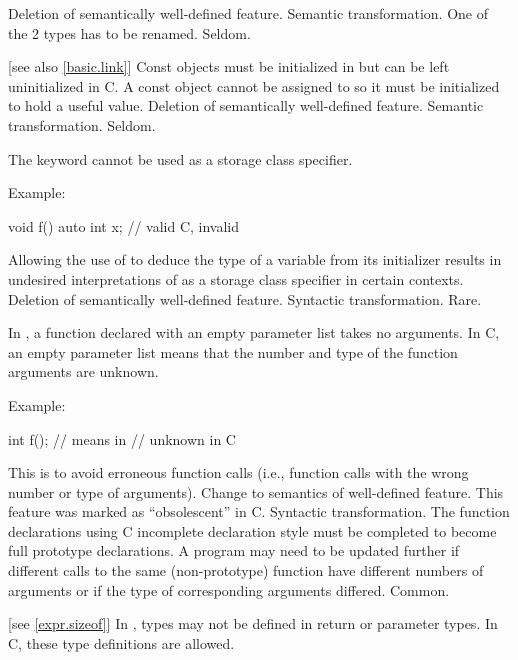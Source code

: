 \effect
Deletion of semantically well-defined feature.
\difficulty
Semantic transformation.
One of the 2 types has to be renamed.
\howwide
Seldom.

 [see also \ref{basic.link}]
\change
Const objects must be initialized in \Cpp{} but can be left uninitialized in C.
\rationale
A const object cannot be assigned to so it must be initialized
to hold a useful value.
\effect
Deletion of semantically well-defined feature.
\difficulty
Semantic transformation.
\howwide
Seldom.

\change
The keyword  cannot be used as a storage class specifier.

Example:
\begin{codeblock}
void f() {
  auto int x;       // valid C, invalid \Cpp{}
}
\end{codeblock}

\rationale
Allowing the use of  to deduce the type
of a variable from its initializer results in undesired interpretations of
 as a storage class specifier in certain contexts.
\effect
Deletion of semantically well-defined feature.
\difficulty
Syntactic transformation.
\howwide
Rare.

\change
In \Cpp{}, a function declared with an empty parameter list takes no arguments.
In C, an empty parameter list means that the number and type of the function arguments are unknown.

Example:
\begin{codeblock}
int f();            // means    in \Cpp{}
                    //  unknown \tcode{)} in C
\end{codeblock}

\rationale
This is to avoid erroneous function calls (i.e., function calls
with the wrong number or type of arguments).
\effect
Change to semantics of well-defined feature.
This feature was marked as ``obsolescent'' in C.
\difficulty
Syntactic transformation.
The function declarations using C incomplete declaration style must
be completed to become full prototype declarations.
A program may need to be updated further if different calls to the
same (non-prototype) function have different numbers of arguments or
if the type of corresponding arguments differed.
\howwide
Common.

 [see \ref{expr.sizeof}]
\change
In \Cpp{}, types may not be defined in return or parameter types.
In C, these type definitions are allowed.

